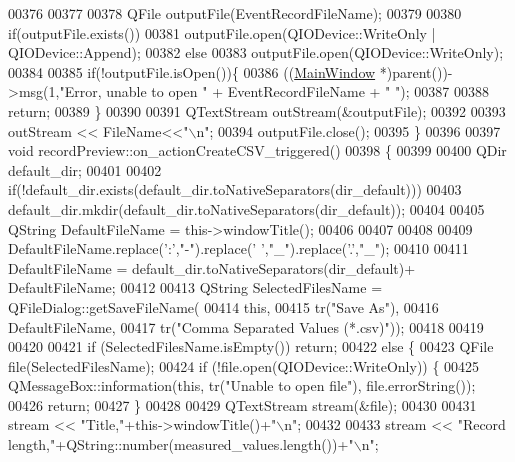 \begin{DoxyCode}
00376 
00377 
00378        QFile outputFile(EventRecordFileName);
00379 
00380        \textcolor{keywordflow}{if}(outputFile.exists())
00381        outputFile.open(QIODevice::WriteOnly | QIODevice::Append);
00382        \textcolor{keywordflow}{else}
00383        outputFile.open(QIODevice::WriteOnly);
00384 
00385        \textcolor{keywordflow}{if}(!outputFile.isOpen())\{
00386            ((\hyperlink{a00017}{MainWindow} *)parent())->msg(1,\textcolor{stringliteral}{"Error, unable to open "} + EventRecordFileName + \textcolor{stringliteral}{" "});
00387 
00388             \textcolor{keywordflow}{return};
00389        \}
00390 
00391        QTextStream outStream(&outputFile);
00392 
00393        outStream << FileName<<\textcolor{stringliteral}{"\(\backslash\)n"};
00394        outputFile.close();
00395 \}
00396 
00397 \textcolor{keywordtype}{void} recordPreview::on\_actionCreateCSV\_triggered()
00398 \{
00399 
00400     QDir default\_dir;
00401 
00402     \textcolor{keywordflow}{if}(!default\_dir.exists(default\_dir.toNativeSeparators(dir\_default)))
00403         default\_dir.mkdir(default\_dir.toNativeSeparators(dir\_default));
00404 
00405     QString DefaultFileName = this->windowTitle();
00406 
00407 
00408 
00409     DefaultFileName.replace(\textcolor{charliteral}{':'},\textcolor{stringliteral}{"-"}).replace(\textcolor{charliteral}{' '},\textcolor{stringliteral}{"\_"}).replace(\textcolor{charliteral}{'.'},\textcolor{stringliteral}{"\_"});
00410 
00411     DefaultFileName = default\_dir.toNativeSeparators(dir\_default)+ DefaultFileName;
00412 
00413     QString SelectedFilesName = QFileDialog::getSaveFileName(
00414         \textcolor{keyword}{this},
00415         tr(\textcolor{stringliteral}{"Save As"}),
00416         DefaultFileName,
00417         tr(\textcolor{stringliteral}{"Comma Separated Values (*.csv)"}));
00418 
00419 
00420 
00421     \textcolor{keywordflow}{if} (SelectedFilesName.isEmpty()) \textcolor{keywordflow}{return};
00422     \textcolor{keywordflow}{else} \{
00423         QFile file(SelectedFilesName);
00424         \textcolor{keywordflow}{if} (!file.open(QIODevice::WriteOnly)) \{
00425             QMessageBox::information(\textcolor{keyword}{this}, tr(\textcolor{stringliteral}{"Unable to open file"}), file.errorString());
00426             \textcolor{keywordflow}{return};
00427         \}
00428 
00429         QTextStream stream(&file);
00430 
00431         stream << \textcolor{stringliteral}{"Title,"}+this->windowTitle()+\textcolor{stringliteral}{"\(\backslash\)n"};
00432 
00433         stream << \textcolor{stringliteral}{"Record length,"}+QString::number(measured\_values.length())+\textcolor{stringliteral}{"\(\backslash\)n"};

\end{DoxyCode}
